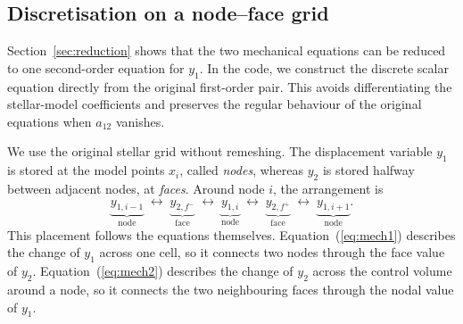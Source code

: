 \documentclass[]{aa}
\begin{document}


\subsection{Discretisation on a node--face grid}
\label{sec:scheme}

Section~\ref{sec:reduction} shows that the two mechanical equations can be reduced to one second-order equation for $y_1$. In the code, we construct the discrete scalar equation directly from the original first-order pair. This avoids differentiating the stellar-model coefficients and preserves the regular behaviour of the original equations when $a_{12}$ vanishes.

We use the original stellar grid without remeshing. The displacement variable $y_1$ is stored at the model points $x_i$, called \emph{nodes}, whereas $y_2$ is stored halfway between adjacent nodes, at \emph{faces}. Around node $i$, the arrangement is
\[
\underbrace{y_{1,i-1}}_{\text{node}}
\;\longleftrightarrow\;
\underbrace{y_{2,f^-}}_{\text{face}}
\;\longleftrightarrow\;
\underbrace{y_{1,i}}_{\text{node}}
\;\longleftrightarrow\;
\underbrace{y_{2,f^+}}_{\text{face}}
\;\longleftrightarrow\;
\underbrace{y_{1,i+1}}_{\text{node}} .
\]
This placement follows the equations themselves. Equation~(\ref{eq:mech1}) describes the change of $y_1$ across one cell, so it connects two nodes through the face value of $y_2$. Equation~(\ref{eq:mech2}) describes the change of $y_2$ across the control volume around a node, so it connects the two neighbouring faces through the nodal value of $y_1$.
\end{document}
